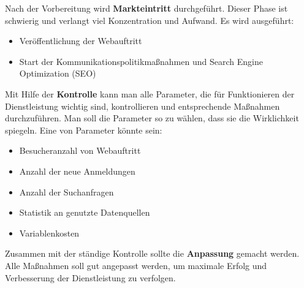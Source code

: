 Nach der Vorbereitung wird \textbf{Markteintritt} durchgeführt. Dieser Phase ist schwierig und verlangt viel Konzentration und Aufwand. Es wird ausgeführt:
\begin{itemize}
\item Veröffentlichung der Webauftritt 
\item Start der Kommunikationspolitikmaßnahmen und Search Engine Optimization (SEO)
\end{itemize}

Mit Hilfe der \textbf{Kontrolle} kann man alle Parameter, die für Funktionieren der Dienstleistung wichtig sind, kontrollieren und entsprechende Maßnahmen durchzuführen. Man soll die Parameter so zu wählen, dass sie die Wirklichkeit spiegeln. Eine von Parameter könnte sein:
\begin{itemize}
\item Besucheranzahl von Webauftritt 
\item Anzahl der neue Anmeldungen 
\item Anzahl der Suchanfragen
\item Statistik an genutzte Datenquellen
\item Variablenkosten 
\end{itemize}

Zusammen mit der ständige Kontrolle sollte die \textbf{Anpassung} gemacht werden. Alle Maßnahmen soll gut angepasst werden, um maximale Erfolg und Verbesserung der Dienstleistung zu verfolgen.
